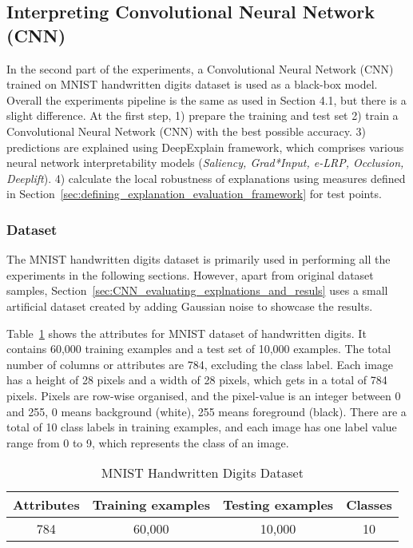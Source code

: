 \documentclass[english]{tktltiki2}
\theoremstyle{definition}
\theoremstyle{remark}
\begin{document}
\subsection{Interpreting Convolutional Neural Network (CNN)}\label{sec:interpret_convolutional_neural_network}
In the second part of the experiments, a Convolutional Neural Network (CNN) trained on MNIST handwritten digits dataset is used as a black-box model. Overall the experiments pipeline is the same as used in Section 4.1, but there is a slight difference. At the first step, 1) prepare the training and test set 2) train a Convolutional Neural Network (CNN) with the best possible accuracy. 3) predictions are explained using DeepExplain framework, which comprises various neural network interpretability models (\textit{Saliency, Grad*Input, e-LRP, Occlusion, Deeplift}). 4) calculate the local robustness of explanations using measures defined in Section~\ref{sec:defining_explanation_evaluation_framework} for test points. 

\subsubsection{Dataset}\label{sec:dataset_MNIST}
The MNIST handwritten digits dataset is primarily used in performing all the experiments in the following sections. However, apart from original dataset samples, Section~\ref{sec:CNN_evaluating_explnations_and_resuls} uses a small artificial dataset created by adding Gaussian noise to showcase the results.

Table~\ref{table:datasets_MNIST} shows the attributes for MNIST dataset of handwritten digits. It contains 60,000 training examples and a test set of 10,000 examples. The total number of columns or attributes are 784, excluding the class label. Each image has a height of 28 pixels and a width of 28 pixels, which gets in a total of 784 pixels. Pixels are row-wise organised, and the pixel-value is an integer between 0 and 255, 0 means background (white), 255 means foreground (black). There are a total of 10 class labels in training examples, and each image has one label value range from  0 to 9, which represents the class of an image.

\begin{table}[H]
	\caption{MNIST Handwritten Digits Dataset }
	\label{table:datasets_MNIST}
	\begin{center}
		\begin{tabular}{|c|c|c|c|}
			\hline	
			\textbf{Attributes} & \textbf{Training examples} & \textbf{Testing examples} & \textbf{Classes} \\ \hline
			784 & 60,000 & 10,000 & 10 \\ \hline
		\end{tabular}
	\end{center}
\end{table}
\end{document}
